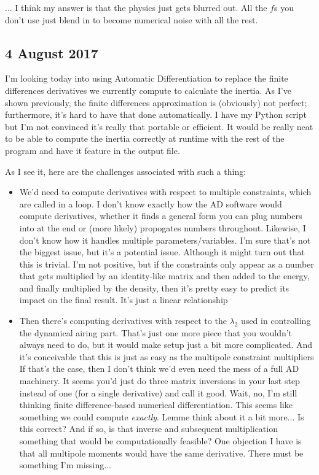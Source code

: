... I think my answer is that the physics just gets blurred out. All the $f$s you don't use just blend in to become numerical noise with all the rest.

\subsection*{4 August 2017}
I'm looking today into using Automatic Differentiation to replace the finite differences derivatives we currently compute to calculate the inertia. As I've shown previously, the finite differences approximation is (obviously) not perfect; furthermore, it's hard to have that done automatically. I have my Python script but I'm not convinced it's really that portable or efficient. It would be really neat to be able to compute the inertia correctly at runtime with the rest of the program and have it feature in the output file.

As I see it, here are the challenges associated with such a thing:
\begin{itemize}
\item We'd need to compute derivatives with respect to multiple constraints, which are called in a loop. I don't know exactly how the AD software would compute derivatives, whether it finds a general form you can plug numbers into at the end or (more likely) propogates numbers throughout. Likewise, I don't know how it handles multiple parameters/variables. I'm sure that's not the biggest issue, but it's a potential issue.
\subitem Although it might turn out that this is trivial. I'm not positive, but if the constraints only appear as a number that gets multiplied by an identity-like matrix and then added to the energy, and finally multiplied by the density, then it's pretty easy to predict its impact on the final result. It's just a linear relationship
\item Then there's computing derivatives with respect to the $\lambda_2$ used in controlling the dynamical airing part. That's just one more piece that you wouldn't always need to do, but it would make setup just a bit more complicated.
\subitem And it's conceivable that this is just as easy as the multipole constraint multipliers If that's the case, then I don't think we'd even need the mess of a full AD machinery. It seems you'd just do three matrix inversions in your last step instead of one (for a single derivative) and call it good. Wait, no, I'm still thinking finite difference-based numerical differentiation. This seems like something we could compute \textit{exactly}. Lemme think about it a bit more...
\subitem Is this correct? And if so, is that inverse and subsequent multiplication something that would be computationally feasible? One objection I have is that all multipole moments would have the same derivative. There must be something I'm missing...
\end{itemize}

